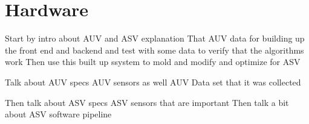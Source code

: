 \section{Hardware}

Start by intro about AUV and ASV explanation
That AUV data for building up the front end and backend and test with some data to verify that the algorithms work
Then use this built up ssystem to mold and modify and optimize for ASV

Talk about AUV specs 
AUV sensors as well
AUV Data set that it was collected

Then talk about ASV specs
ASV sensors that are important
Then talk a bit about ASV software pipeline